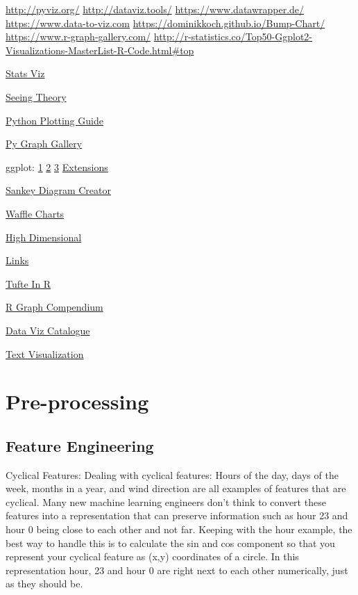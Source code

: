 \documentclass[]{book}
\begin{document}
\url{http://pyviz.org/} \url{http://dataviz.tools/} \url{https://www.datawrapper.de/} \url{https://www.data-to-viz.com} \url{https://dominikkoch.github.io/Bump-Chart/} \url{https://www.r-graph-gallery.com/} \url{http://r-statistics.co/Top50-Ggplot2-Visualizations-MasterList-R-Code.html\#top}

\href{http://emilkirkegaard.dk/understanding_statistics/}{Stats Viz}

\href{http://students.brown.edu/seeing-theory/}{Seeing Theory}

\href{http://pythonplot.com/}{Python Plotting Guide}

\href{https://python-graph-gallery.com}{Py Graph Gallery}

ggplot: \href{https://www.pitt.edu/~naraehan/presentation/Graphs_and_Plots_using_Plotly.html}{1} \href{https://plot.ly/python/table/}{2} \href{https://plot.ly/python/html-reports/}{3} \href{http://www.ggplot2-exts.org/gallery/}{Extensions}

\href{http://sankeymatic.com}{Sankey Diagram Creator}

\href{https://nsaunders.wordpress.com/2017/09/08/infographic-style-charts-using-the-r-waffle-package/}{Waffle Charts}

\href{https://research.googleblog.com/2016/12/open-sourcing-embedding-projector-tool.html}{High Dimensional}

\href{http://www.thehackerwithin.org/swinburne/links.html}{Links}

\href{http://motioninsocial.com/tufte/}{Tufte In R}

\href{http://shinyapps.org/apps/RGraphCompendium/index.php}{R Graph Compendium}

\href{http://www.datavizcatalogue.com/index.html}{Data Viz Catalogue}

\href{http://textvis.lnu.se/}{Text Visualization}

\hypertarget{pre-processing}{%
\section{Pre-processing}\label{pre-processing}}

\hypertarget{feature-engineering}{%
\subsection{Feature Engineering}\label{feature-engineering}}

Cyclical Features: Dealing with cyclical features: Hours of the day, days of the week, months in a year, and wind direction are all examples of features that are cyclical. Many new machine learning engineers don't think to convert these features into a representation that can preserve information such as hour 23 and hour 0 being close to each other and not far. Keeping with the hour example, the best way to handle this is to calculate the sin and cos component so that you represent your cyclical feature as (x,y) coordinates of a circle. In this representation hour, 23 and hour 0 are right next to each other numerically, just as they should be.
\end{document}
